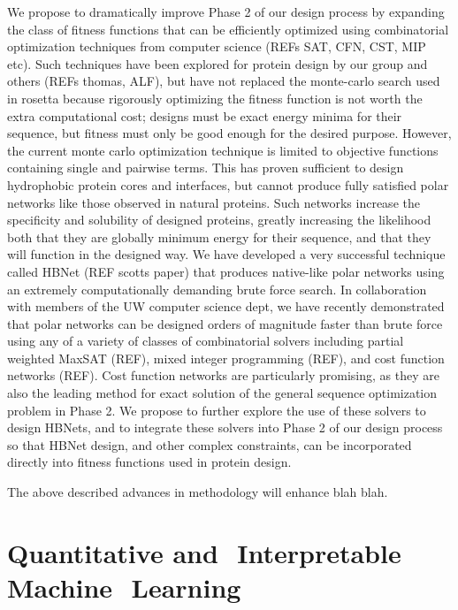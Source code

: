 \documentclass{article}
\begin{document}
We propose to dramatically improve Phase 2 of our design process by expanding
the class of fitness functions that can be efficiently optimized using
combinatorial optimization techniques from computer science (REFs SAT, CFN, CST,
MIP etc). Such techniques have been explored for protein design by our group and
others (REFs thomas, ALF), but have not replaced the monte-carlo search used in
rosetta because rigorously optimizing the fitness function is not worth the
extra computational cost; designs must be exact energy minima for their
sequence, but fitness must only be good enough for the desired purpose. However,
the current monte carlo optimization technique is limited to objective functions
containing single and pairwise terms. This has proven sufficient to design
hydrophobic protein cores and interfaces, but cannot produce fully satisfied
polar networks like those observed in natural proteins. Such networks increase
the specificity and solubility of designed proteins, greatly increasing the
likelihood both that they are globally minimum energy for their sequence, and
that they will function in the designed way. We have developed a very successful
technique called HBNet (REF scotts paper) that produces native-like polar
networks using an extremely computationally demanding brute force search. In
collaboration with members of the UW computer science dept, we have recently
demonstrated that polar networks can be designed orders of magnitude faster than
brute force using any of a variety of classes of combinatorial solvers including
partial weighted MaxSAT (REF), mixed integer programming (REF), and cost
function networks (REF). Cost function networks are particularly promising, as
they are also the leading method for exact solution of the general sequence
optimization problem in Phase 2. We propose to further explore the use of these
solvers to design HBNets, and to integrate these solvers into Phase 2 of our
design process so that HBNet design, and other complex constraints, can be
incorporated directly into fitness functions used in protein design.


The above described advances in methodology will enhance blah blah.






\section{Quantitative​ ​ and​ ​ Interpretable​ ​ Machine​ ​ Learning}
\end{document}

